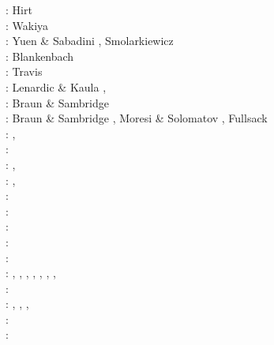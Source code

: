 \begin{scriptsize}
\nineteenseventyfour: Hirt \etal \cite{hiac74}\\
\nineteenseventyfive: Wakiya \cite{waki75a,waki75b}\\
\nineteeneightyfour: Yuen \& Sabadini \cite{yusa84}, Smolarkiewicz \cite{smol84}\\
\nineteeneightynine: Blankenbach \etal \cite{blbc89}\\
\nineteenninety: Travis \etal \cite{trab90}\\
\nineteenninetythree: Lenardic \& Kaula \cite{leka93}, \cite{mamc93}\\
\nineteenninetyfour: Braun \& Sambridge \cite{brsa94}\\
\nineteenninetyfive: Braun \& Sambridge \cite{brsa95}, Moresi \& Solomatov \cite{moso95}, 
                     Fullsack \cite{full95}\\
\nineteenninetysix: \cite{zhon96}, \cite{mozg96}\\
\nineteenninetyseven: \cite{rist97}\\
\nineteenninetynine: \cite{lind99}, \cite{bird99}\\
\twothousandone: \cite{modm01}, \cite{vank01}\\
\twothousandtwo: \cite{mudm02}\\
\twothousandthree: \cite{taki03}\cite{modm03}\cite{geyu03}\cite{geyu03b}\cite{taxi03}\cite{scpo03}\\
\twothousandfour: \cite{kaps04}\cite{kasa04}\cite{kaks08}\cite{mumc04}\\
\twothousandfive: \cite{mure05}\\
\twothousandsix: \cite{kapo06}\cite{more06}\cite{onmm06}\cite{mudm06}\cite{tact06}\\
\twothousandseven: 
\cite{toma07},
\cite{chcc07},
\cite{kabe07},
\cite{kaks07},
\cite{moql07},
\cite{geyu07},
\cite{dadh07},
\cite{zldf07}\\
\twothousandeight: \cite{zhmt08}\cite{deka08}\cite{trub08}\cite{krdp08}\cite{mamo08}\cite{gepd98}
      \cite{vack08}\cite{heta08}\cite{brtf08}\cite{daks08}\cite{chzy08}\cite{tack08}\cite{hust08b}\\
\twothousandnine: \cite{king09}, \cite{geum09}, \cite{vemm09}, 
                  \cite{qurj09}\\
\twothousandten: \cite{kaus10}\cite{kamm10}\cite{elga10}\cite{kilv10}\\
\twothousandeleven: \cite{dumg11}\cite{uibb11}\cite{hegc11}\cite{muso11}\cite{dawk11}\cite{lemm11}\\

\end{scriptsize}
